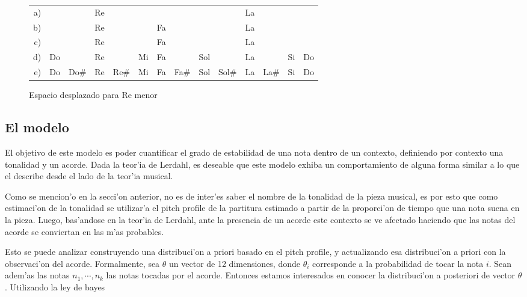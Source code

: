 \begin{figure}[!h]
\begin{center}
\begin{tabular}{r c c c c c c c c c c c c c} 
a) &    &      & Re &      &    &    &     &      &       & La &      &    &  \\
b) &    &      & Re &      &    & Fa &     &      &       & La &      &    &  \\
c) &    &      & Re &      &    & Fa &     &      &       & La &      &    &  \\
d) & Do &      & Re &      & Mi & Fa &     &  Sol &       & La &      & Si & Do\\
e) & Do & Do\# & Re & Re\# & Mi & Fa & Fa\# & Sol & Sol\# & La & La\# & Si & Do\\
\end{tabular}
\newline
\caption{ Espacio desplazado para Re menor}
\label{fig:dm_space}
\end{center}
\end{figure}

\subsection{El modelo}
\label{sec:harmonic_context_model}
El objetivo de este modelo es poder cuantificar el grado de estabilidad de una nota dentro de un contexto, definiendo por contexto una tonalidad y un acorde. 
Dada la teor'ia de Lerdahl, es deseable que este modelo exhiba un comportamiento de alguna forma similar a lo que el describe desde el lado de la teor'ia musical. 

Como se mencion'o en la secci'on anterior, no es de inter'es saber el nombre de la tonalidad de la pieza musical, es por esto que como estimaci'on de la 
tonalidad se utilizar'a el pitch profile de la partitura estimado a partir de la proporci'on de tiempo que una nota suena en la pieza. Luego, bas'andose en 
la teor'ia de Lerdahl, ante la presencia de un acorde este contexto se ve afectado haciendo que las notas del acorde se conviertan en las m'as probables.  

Esto se puede analizar construyendo una distribuci'on a priori basado en el pitch profile, y actualizando esa distribuci'on a priori con la observaci'on del acorde. 
Formalmente, sea $\theta$ un vector de 12 dimensiones, donde $\theta_i$ corresponde a la probabilidad de tocar la nota $i$. Sean adem'as las notas $n_1, \cdots, n_k$ las notas 
tocadas por el acorde. Entonces estamos interesados en conocer la distribuci'on a posteriori de vector $\theta$. Utilizando la ley de bayes

